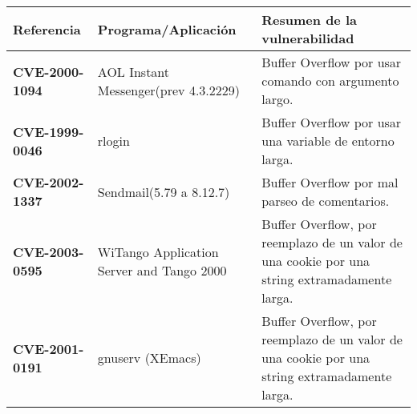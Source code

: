 \begin{tabular}[\baselineskip]{|p{1.75cm}|p{3.5cm}|p{8cm}|}
  \hline
  \textbf{Referencia} & Programa/Aplicación & Resumen de la vulnerabilidad \\
  \hline
  \textbf{CVE-2000- 1094} & AOL Instant Messenger(prev 4.3.2229) & Buffer Overflow por usar comando con argumento largo. \\
  \hline
  \textbf{CVE-1999- 0046} & rlogin & Buffer Overflow por usar una variable de entorno larga. \\
  \hline
  \textbf{CVE-2002- 1337} & Sendmail(5.79 a 8.12.7) & Buffer Overflow por mal parseo de comentarios. \\
  \hline
  \textbf{CVE-2003- 0595} & WiTango Application Server and Tango 2000 & Buffer Overflow, por reemplazo de un valor de una cookie por una string extramadamente larga.\\
  \hline
  \textbf{CVE-2001- 0191} & gnuserv (XEmacs) & Buffer Overflow, por reemplazo de un valor de una cookie por una string extramadamente larga. \\
  \hline
\end{tabular}
